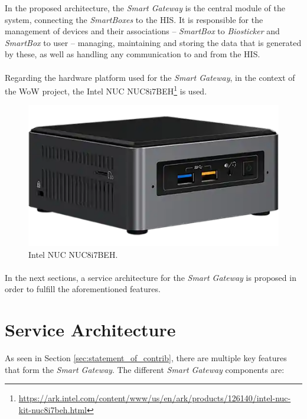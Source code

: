 In the proposed architecture, the \textit{Smart Gateway} is the central module of the system, connecting the \textit{SmartBoxes} to the \acs{HIS}. It is responsible for the management of devices and their associations -- \textit{SmartBox} to \textit{Biosticker} and \textit{SmartBox} to user -- managing, maintaining and storing the data that is generated by these, as well as handling any communication to and from the \acs{HIS}. 


\paragraph{} Regarding the hardware platform used for the \textit{Smart Gateway}, in the context of the \acs{WoW} project, the Intel NUC NUC8i7BEH\footnote{\url{https://ark.intel.com/content/www/us/en/ark/products/126140/intel-nuc-kit-nuc8i7beh.html}} is used.

\begin{figure}[H]
    \centering
    \includegraphics[width=0.4\linewidth]{images/gateway-image.png}
    \caption[Intel NUC NUC8i7BEH.]{Intel NUC NUC8i7BEH.}
    \label{fig:gateway_image}
\end{figure}


\paragraph{} In the next sections, a service architecture for the \textit{Smart Gateway} is proposed in order to fulfill the aforementioned features.



\section{Service Architecture}

As seen in Section \ref{sec:statement_of_contrib}, there are multiple key features that form the \textit{Smart Gateway}. The different \textit{Smart Gateway} components are:  

